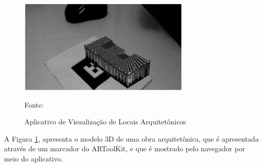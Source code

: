 		\begin{figure}[H]
			\centering
			\includegraphics[scale=1]{imagens/arquitetura}
			\caption{Aplicativo de Visualização de Locais Arquitetônicos}
			Fonte: 
			\label{fig:arq}
		\end{figure}
		
		A Figura \ref{fig:arq}, apresenta o modelo 3D de uma obra arquitetônica, que é apresentada através de um marcador do ARToolKit, e que é mostrado pelo navegador por meio do aplicativo. 
		 